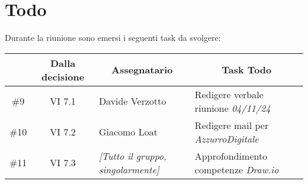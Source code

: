 

\section{Todo}

Durante la riunione sono emersi i seguenti task da svolgere:

\vspace{0.5cm}

\begin{table}[htbp]
\centering
{}
\begin{tabular}{|c|c|p{}|p{}|}
    \hline
    \rowcolor[gray]{0.75}
    \multicolumn{1}{|c|}{\textbf{Codice}} & \multicolumn{1}{|c|}{\textbf{Dalla decisione}} & \multicolumn{1}{|c|}{\textbf{Assegnatario}} & \multicolumn{1}{|c|}{\textbf{Task Todo}} \\
    \hline
    \#9 & VI 7.1 & Davide Verzotto & Redigere verbale riunione \emph{04/11/24} \\
    \hline
    \#10 & VI 7.2 & Giacomo Loat & Redigere mail per \emph{AzzurroDigitale} \\
    \hline
    \#11 & VI 7.3 & \emph{[Tutto il gruppo, singolarmente]} & Approfondimento competenze \emph{Draw.io} \\
    \hline
\end{tabular}
\end{table}
